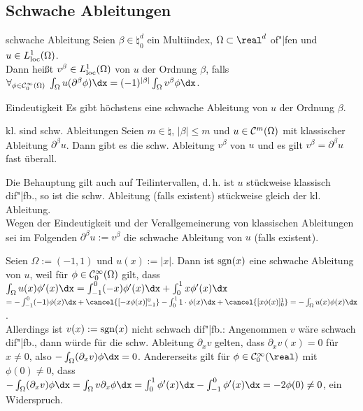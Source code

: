 \subsection{%
    Schwache Ableitungen%
}

\begin{Def}{schwache Ableitung}
    Seien $\beta \in \natural_0^d$ ein Multiindex, $\Omega \subset \real^d$ of"|fen und
    $u \in L^1_{\text{loc}}(\Omega)$.\\
    Dann heißt $v^\beta \in L^1_{\text{loc}}(\Omega)$  von $u$
    der Ordnung $\beta$, falls\\
    $\forall_{\phi \in \C^\infty_0(\Omega)}\; \int_\Omega u (\partial^\beta \phi) \dx
    = (-1)^{|\beta|} \int_\Omega v^\beta \phi \dx$.
\end{Def}

\begin{Satz}{Eindeutigkeit}
    Es gibt höchstens eine schwache Ableitung von $u$ der Ordnung $\beta$.
\end{Satz}

\begin{Satz}{kl. sind schw. Ableitungen}
    Seien $m \in \natural$, $|\beta| \le m$ und $u \in \mathcal{C}^m(\Omega)$ mit
    klassischer Ableitung $\partial^\beta u$.
    Dann gibt es die schw. Ableitung $v^\beta$ von $u$
    und es gilt $v^\beta = \partial^\beta u$ fast überall.
\end{Satz}

\begin{Bem}
    Die Behauptung gilt auch auf Teilintervallen, d.\,h. ist $u$ stückweise klassisch
    dif"|fb., so ist die schw. Ableitung (falls existent) stückweise gleich der
    kl. Ableitung.\\
    Wegen der Eindeutigkeit und der Verallgemeinerung von klassischen Ableitungen sei
    im Folgenden $\partial^\beta u := v^\beta$ die schwache Ableitung von $u$
    (falls existent).
\end{Bem}

\linie

\begin{Bsp}
    Seien $\Omega := (-1, 1)$ und $u(x) := |x|$.
    Dann ist $\operatorname{sgn}(x)$ eine schwache Ableitung von $u$, weil für $\phi \in \mathcal{C}^\infty_0(\Omega)$
    gilt, dass $\int_\Omega u(x) \phi'(x) \dx
    = \int_{-1}^0 (-x) \phi'(x) \dx + \int_0^1 x \phi'(x) \dx$\\
    $= -\int_{-1}^0 (-1) \phi(x) \dx + \cancel{[-x \phi(x)]_{-1}^0} -
    \int_0^1 1 \cdot \phi(x) \dx + \cancel{[x \phi(x)]_0^1}
    = -\int_\Omega u(x) \phi(x) \dx$.\\
    Allerdings ist $v(x) := \operatorname{sgn}(x)$ nicht schwach dif"|fb.:
    Angenommen $v$ wäre schwach dif"|fb., dann würde für die schw. Ableitung $\partial_x v$
    gelten, dass $\partial_x v(x) = 0$ für $x \not= 0$,
    also $-\int_\Omega (\partial_x v) \phi \dx = 0$.
    Andererseits gilt für $\phi \in \C^\infty_0(\real)$ mit $\phi(0) \not= 0$, dass\\
    $-\int_\Omega (\partial_x v) \phi \dx = \int_\Omega v \partial_x \phi \dx
    = \int_0^1 \phi'(x) \dx - \int_{-1}^0 \phi'(x) \dx = -2\phi(0) \not= 0$, ein Widerspruch.
\end{Bsp}

